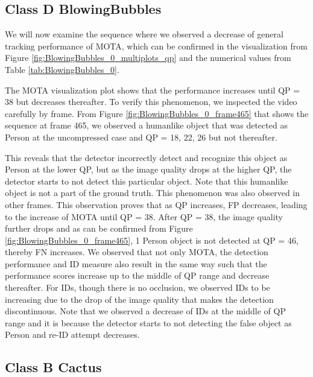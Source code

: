 \subsection{Class D BlowingBubbles}
We will now examine the sequence where we observed a decrease of general tracking performance of MOTA, which can be confirmed in the visualization from Figure \ref{fig:BlowingBubbles_0_multiplots_qp} and the numerical values from Table \ref{tab:BlowingBubbles_0}.


The MOTA visualization plot shows that the performance increases until QP = 38 but decreases thereafter. To verify this phenomenon, we inspected the video carefully by frame. From Figure \ref{fig:BlowingBubbles_0_frame465} that shows the sequence at frame 465, we observed a humanlike object that was detected as Person at the uncompressed case and QP = 18, 22, 26 but not thereafter.

This reveals that the detector incorrectly detect and recognize this object as Person at the lower QP, but as the image quality drops at the higher QP, the detector starts to not detect this particular object. Note that this humanlike object is not a part of the ground truth. This phenomenon was also observed in other frames. This observation proves that as QP increases, FP decreases, leading to the increase of MOTA until QP = 38. After QP = 38, the image quality further drops and as can be confirmed from Figure \ref{fig:BlowingBubbles_0_frame465}, 1 Person object is not detected at QP = 46, thereby FN increases. We observed that not only MOTA, the detection performance and ID measure also result in the same way such that the performance scores increase up to the middle of QP range and decrease thereafter. For IDs, though there is no occlusion, we observed IDs to be increasing due to the drop of the image quality that makes the detection discontinuous. Note that we observed a decrease of IDs at the middle of QP range and it is because the detector starts to not detecting the false object as Person and re-ID attempt decreases.


\subsection{Class B Cactus}

